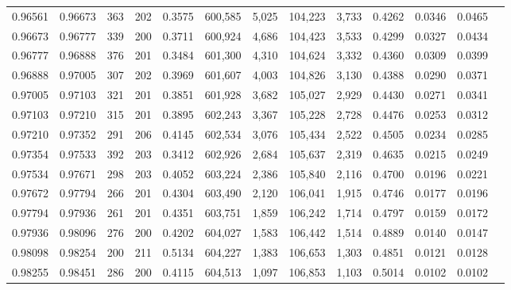 \begin{tabular}{rrrrrrrrrrrrr}
0.96561 & 0.96673 &   363 & 202 &                                     0.3575 & 600,585 &   5,025 & 104,223 &   3,733 & 0.4262 & 0.0346 & 0.0465 \\
0.96673 & 0.96777 &   339 & 200 &                                     0.3711 & 600,924 &   4,686 & 104,423 &   3,533 & 0.4299 & 0.0327 & 0.0434 \\
0.96777 & 0.96888 &   376 & 201 &                                     0.3484 & 601,300 &   4,310 & 104,624 &   3,332 & 0.4360 & 0.0309 & 0.0399 \\
0.96888 & 0.97005 &   307 & 202 &                                     0.3969 & 601,607 &   4,003 & 104,826 &   3,130 & 0.4388 & 0.0290 & 0.0371 \\
0.97005 & 0.97103 &   321 & 201 &                                     0.3851 & 601,928 &   3,682 & 105,027 &   2,929 & 0.4430 & 0.0271 & 0.0341 \\
0.97103 & 0.97210 &   315 & 201 &                                     0.3895 & 602,243 &   3,367 & 105,228 &   2,728 & 0.4476 & 0.0253 & 0.0312 \\
0.97210 & 0.97352 &   291 & 206 &                                     0.4145 & 602,534 &   3,076 & 105,434 &   2,522 & 0.4505 & 0.0234 & 0.0285 \\
0.97354 & 0.97533 &   392 & 203 &                                     0.3412 & 602,926 &   2,684 & 105,637 &   2,319 & 0.4635 & 0.0215 & 0.0249 \\
0.97534 & 0.97671 &   298 & 203 &                                     0.4052 & 603,224 &   2,386 & 105,840 &   2,116 & 0.4700 & 0.0196 & 0.0221 \\
0.97672 & 0.97794 &   266 & 201 &                                     0.4304 & 603,490 &   2,120 & 106,041 &   1,915 & 0.4746 & 0.0177 & 0.0196 \\
0.97794 & 0.97936 &   261 & 201 &                                     0.4351 & 603,751 &   1,859 & 106,242 &   1,714 & 0.4797 & 0.0159 & 0.0172 \\
0.97936 & 0.98096 &   276 & 200 &                                     0.4202 & 604,027 &   1,583 & 106,442 &   1,514 & 0.4889 & 0.0140 & 0.0147 \\
0.98098 & 0.98254 &   200 & 211 &                                     0.5134 & 604,227 &   1,383 & 106,653 &   1,303 & 0.4851 & 0.0121 & 0.0128 \\
0.98255 & 0.98451 &   286 & 200 &                                     0.4115 & 604,513 &   1,097 & 106,853 &   1,103 & 0.5014 & 0.0102 & 0.0102 \\

\end{tabular}
